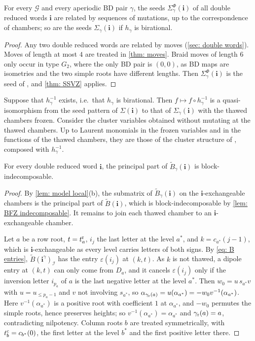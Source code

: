 \documentclass[a4paper]{amsart}
\numberwithin{equation}{section}
\theoremstyle{definition}
\theoremstyle{remark}
\newcommand{\mcG}{\mathcal{G}}
\newcommand{\mcI}{\mathcal{I}}
\newcommand{\bfi}{\mathbf{i}}
\newcommand{\tB}{\widetilde{B}}
\newcommand{\rr}{{\rm r}}
\newcommand{\cc}{{\rm c}}
\begin{document}
\begin{corollary}
  \label{cor: mutation equivalent}
  For every $\mcG$ and every aperiodic BD pair $\gamma$, the seeds $\Sigma^\Phi_\gamma(\bfi)$ of all double reduced words $\bfi$ are related by sequences of mutations, up to the correspondence of chambers; so are the seeds $\Sigma_\gamma(\bfi)$ if $h_\gamma$ is birational.
\end{corollary}
\begin{proof}

  Any two double reduced words are related by moves (\cref{sec: double words}).
  Moves of length at most $4$ are treated in \cref{thm: moves}.
  Braid moves of length $6$ only occur in type $G_2$, where the only BD pair is $(0,0)$, as BD maps are isometries and the two simple roots have different lengths.
  Then $\Sigma^\Phi_\gamma(\bfi)$ is the seed of \cite[Theorem~2.10]{BFZ05}, and \cref{thm: SSVZ} applies.
\end{proof}

Suppose that $h_\gamma^{-1}$ exists, i.e.\ that $h_\gamma$ is birational.
Then $f\mapsto f\circ h_\gamma^{-1}$ is a quasi-isomorphism from the seed pattern of $\Sigma(\bfi)$ to that of $\Sigma_\gamma(\bfi)$ with the thawed chambers frozen.
Consider the cluster variables obtained without mutating at the thawed chambers.
Up to Laurent monomials in the frozen variables and in the functions of the thawed chambers, they are those of the cluster structure of \cite{BFZ05}, composed with $h_\gamma^{-1}$.

\begin{lemma}
  \label{lem: indecomposable}
  For every double reduced word $\bfi$, the principal part of $\tB_\gamma(\bfi)$ is block-indecomposable.
\end{lemma}
\begin{proof}
  By \cref{lem: model local}(b), the submatrix of $\tB_\gamma(\bfi)$ on the $\bfi$-exchangeable chambers is the principal part of $\tB(\bfi)$, which is block-indecomposable by \cref{lem: BFZ indecomposable}.
  It remains to join each thawed chamber to an $\bfi$-exchangeable chamber.

  Let $a$ be a row root, $t=t^\rr_a$, $i_j$ the last letter at the level $a^*$, and $k=c_{a^*}(j-1)$, which is $\bfi$-exchangeable as every level carries letters of both signs.
  By \eqref{eq: B entries}, $\tB(\bfi^\gamma)_\mcI$ has the entry $\varepsilon(i_j)$ at $(k,t)$.
  As $k$ is not thawed, a dipole entry at $(k,t)$ can only come from $D_a$, and it cancels $\varepsilon(i_j)$ only if the inversion letter $i_{p_a}$ of $a$ is the last negative letter at the level $a^*$.
  Then $w_0=u\,s_{a^*}v$ with $u=u_{\le p_a-1}$ and $v$ not involving $s_{a^*}$, so $\alpha_{\gamma_{\rr}(a)}=u(\alpha_{a^*})=-w_0v^{-1}(\alpha_{a^*})$.
  Here $v^{-1}(\alpha_{a^*})$ is a positive root with coefficient $1$ at $\alpha_{a^*}$, and $-w_0$ permutes the simple roots, hence preserves heights; so $v^{-1}(\alpha_{a^*})=\alpha_{a^*}$ and $\gamma_{\rr}(a)=a$, contradicting nilpotency.
  Column roots $b$ are treated symmetrically, with $t^\cc_b=c_{b^*}(0)$, the first letter at the level $b^*$ and the first positive letter there.
\end{proof}
\end{document}
